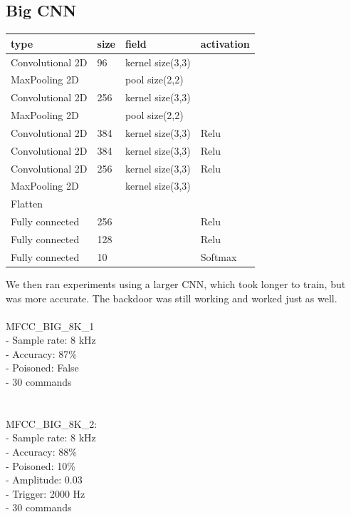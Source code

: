 \documentclass{article}
\theoremstyle{definition}
\theoremstyle{remark}
\begin{document}
\subsection{Big CNN}
\begin{table}[]
\begin{tabular}{llll}
\hline
type & size & field & activation \\ \hline
Convolutional 2D & 96 & kernel size(3,3) &  \\
MaxPooling 2D &  & pool size(2,2) &  \\
Convolutional 2D & 256 & kernel size(3,3) &  \\
MaxPooling 2D &  & pool size(2,2) &  \\
Convolutional 2D & 384 & kernel size(3,3) & Relu \\
Convolutional 2D & 384 & kernel size(3,3) & Relu \\
Convolutional 2D & 256 & kernel size(3,3) & Relu \\
MaxPooling 2D & & kernel size(3,3) &  \\
Flatten & & &  \\
Fully connected & 256 & & Relu  \\
Fully connected & 128 & & Relu \\ 
Fully connected & 10 & & Softmax \\ 
\hline
\end{tabular}
\end{table}
We then ran experiments using a larger CNN, which took longer to train, but was more accurate. The backdoor was still working and worked just as well.
\\\\
MFCC\_BIG\_8K\_1\\
- Sample rate: 8 kHz\\
- Accuracy: 87\%\\
- Poisoned: False\\
- 30 commands\\
\\\\
MFCC\_BIG\_8K\_2:\\
- Sample rate: 8 kHz\\
- Accuracy: 88\%\\
- Poisoned: 10\%\\
- Amplitude: 0.03\\
- Trigger: 2000 Hz\\
- 30 commands\\
\end{document}
